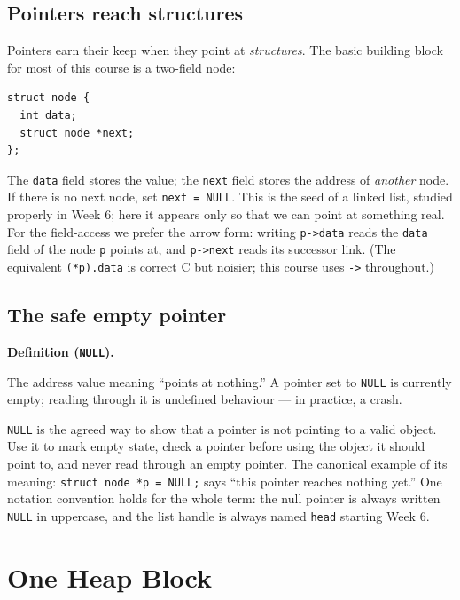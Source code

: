 \documentclass[11pt]{article}
\newenvironment{definitionbox}[1]{%
  \par\noindent\textbf{Definition (#1).}\ \itshape
}{\par\vspace{0.3em}}
\begin{document}
\subsection{Pointers reach structures}

Pointers earn their keep when they point at \emph{structures}. The basic
building block for most of this course is a two-field node:

\begin{center}
\small
\begin{verbatim}
struct node {
  int data;
  struct node *next;
};
\end{verbatim}
\end{center}

The \texttt{data} field stores the value; the \texttt{next} field stores the
address of \emph{another} node. If there is no next node, set
\texttt{next = NULL}. This is the seed of a linked list, studied properly in
Week 6; here it appears only so that we can point at something real.
 For the
field-access we prefer the arrow form: writing \texttt{p->data} reads the
\texttt{data} field of the node \texttt{p} points at, and \texttt{p->next} reads
its successor link. (The equivalent \texttt{(*p).data} is correct C but noisier;
this course uses \texttt{->} throughout.)

\subsection{The safe empty pointer}

\begin{definitionbox}{\texttt{NULL}}
The address value meaning ``points at nothing.'' A pointer set to \texttt{NULL}
is currently empty; reading through it is undefined behaviour --- in practice, a
crash.
\end{definitionbox}

\texttt{NULL} is the agreed way to show that a pointer is not pointing to a
valid object. Use it to mark empty state, check a pointer before using the
object it should point to, and never read through an empty pointer. The
canonical example of its meaning: \texttt{struct node *p = NULL;} says ``this
pointer reaches nothing yet.'' One notation convention holds for the whole
term: the null pointer is always written \texttt{NULL} in uppercase, and the
list handle is always named \texttt{head} starting Week 6.

\section{One Heap Block}
\label{sec:heap}
\end{document}
